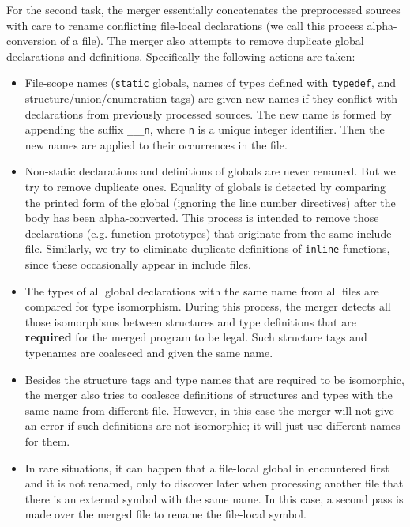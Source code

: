 \documentclass{article}
\def\t#1{{\tt #1}}
\begin{document}
 For the second task, the merger essentially concatenates the preprocessed
sources with care to rename conflicting file-local declarations (we call this
process alpha-conversion of a file). The merger also attempts to remove
duplicate global declarations and definitions. Specifically the following
actions are taken: 

\begin{itemize}
\item File-scope names (\t{static} globals, names of types defined with
\t{typedef}, and structure/union/enumeration tags) are given new names if they
conflict with declarations from previously processed sources. The new name is
formed by appending the suffix \t{\_\_\_n}, where \t{n} is a unique integer
identifier. Then the new names are applied to their occurrences in the file. 

\item Non-static declarations and definitions of globals are never renamed.
But we try to remove duplicate ones. Equality of globals is detected by
comparing the printed form of the global (ignoring the line number directives)
after the body has been alpha-converted. This process is intended to remove
those declarations (e.g. function prototypes) that originate from the same
include file. Similarly, we try to eliminate duplicate definitions of
\t{inline} functions, since these occasionally appear in include files.

\item The types of all global declarations with the same name from all files
are compared for type isomorphism. During this process, the merger detects all
those isomorphisms between structures and type definitions that are {\bf
required} for the merged program to be legal. Such structure tags and
typenames are coalesced and given the same name. 

\item Besides the structure tags and type names that are required to be
isomorphic, the merger also tries to coalesce definitions of structures and
types with the same name from different file. However, in this case the merger
will not give an error if such definitions are not isomorphic; it will just
use different names for them. 

\item In rare situations, it can happen that a file-local global in
encountered first and it is not renamed, only to discover later when
processing another file that there is an external symbol with the same name.
In this case, a second pass is made over the merged file to rename the
file-local symbol. 
\end{itemize}
\end{document}
